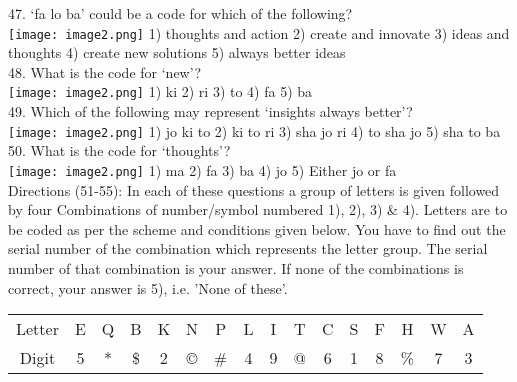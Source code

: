 \documentclass[
]{article}
\begin{document}
47. ‘fa lo ba’ could be a code for which of the following?\\
\texttt{[image: image2.png]}
1) thoughts and action \hspace{2mm}2) create and innovate \hspace{2mm}3) ideas and thoughts \hspace{2mm}4) create new solutions \hspace{2mm}5) always better ideas\\

48. What is the code for ‘new’?\\
\texttt{[image: image2.png]}
1) ki \hspace{2mm}2) ri \hspace{2mm}3) to \hspace{2mm}4) fa \hspace{2mm}5) ba\\

49. Which of the following may represent ‘insights always better’?\\
\texttt{[image: image2.png]}
1) jo ki to \hspace{2mm}2) ki to ri \hspace{2mm}3) sha jo ri \hspace{2mm}4) to sha jo \hspace{2mm}5) sha to ba\\

50. What is the code for ‘thoughts’?\\
\texttt{[image: image2.png]}
1) ma \hspace{2mm}2) fa \hspace{2mm}3) ba \hspace{2mm}4) jo \hspace{2mm}5) Either jo or fa\\

Directions (51-55): In each of these questions a group of letters is given followed by four
Combinations of number/symbol numbered 1), 2), 3) & 4). Letters are to be coded as per the
scheme and conditions given below. You have to find out the serial number of the combination
which represents the letter group. The serial number of that combination is your answer. If none
of the combinations is correct, your answer is 5), i.e. 'None of these'.

\begin{tabular}{ c c c c c c c c c c c c c c c c}
 Letter & E & Q & B& K& N& P& L& I& T& C& S& F& H& W& A\\ 
 Digit &5 &*& \$& 2& ©& \#& 4& 9& @& 6& 1& 8& \%& 7& 3 \\  
\end{tabular}\\
\end{document}
